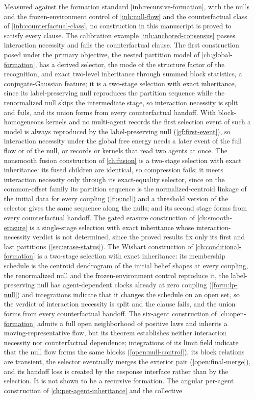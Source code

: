 Measured against the formation standard \cref{inh:recursive-formation}, with the nulls and the frozen-environment control of \cref{inh:null-flow} and the counterfactual class of \cref{inh:counterfactual-class}, no construction in this manuscript is proved to satisfy every clause. The calibration example \cref{inh:anchored-consensus} passes interaction necessity and fails the counterfactual clause. The first construction posed under the primary objective, the nested partition model of \cref{ch:global-formation}, has a derived selector, the mode of the structure factor of the recognition, and exact two-level inheritance through summed block statistics, a conjugate-Gaussian feature; it is a two-stage selection with exact inheritance, since its label-preserving null reproduces the partition sequence while the renormalized null skips the intermediate stage, so interaction necessity is split and fails, and its union forms from every counterfactual handoff. With block-homogeneous kernels and no multi-agent records the first selection event of such a model is always reproduced by the label-preserving null (\cref{gf:first-event}), so interaction necessity under the global free energy needs a later event of the full flow or of the null, or records or kernels that read two agents at once. The nonsmooth fusion construction of \cref{ch:fusion} is a two-stage selection with exact inheritance: its fused children are identical, so compression fails; it meets interaction necessity only through its exact-equality selector, since on the common-offset family its partition sequence is the normalized-centroid linkage of the initial data for every coupling (\cref{fus:ncl}) and a threshold version of the selector gives the same sequence along the nulls; and its second stage forms from every counterfactual handoff. The gated erasure construction of \cref{ch:smooth-erasure} is a single-stage selection with exact inheritance whose interaction-necessity verdict is not determined, since the proved results fix only its first and last partitions (\cref{sec:erase-status}). The Wishart construction of \cref{ch:conditional-formation} is a two-stage selection with exact inheritance: its membership schedule is the centroid dendrogram of the initial belief shapes at every coupling, the renormalized null and the frozen-environment control reproduce it, the label-preserving null has agent-dependent clocks already at zero coupling (\cref{form:lp-null}) and integrations indicate that it changes the schedule on an open set, so the verdict of interaction necessity is split and the clause fails, and the union forms from every counterfactual handoff. The six-agent construction of \cref{ch:open-formation} admits a full open neighborhood of positive laws and inherits a moving-representative flow, but its theorem establishes neither interaction necessity nor counterfactual dependence; integrations of its limit field indicate that the null flow forms the same blocks (\cref{open:null-control}), its block relations are transient, the selector eventually merges the exterior pair (\cref{open:final-merge}), and its handoff loss is created by the response interface rather than by the selection. It is not shown to be a recursive formation. The angular per-agent construction of \cref{ch:per-agent-inheritance} and the collective 